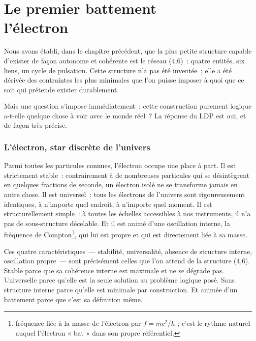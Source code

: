 \documentclass[12pt, a4paper, openright]{book}
\begin{document}
\chapter[Le premier battement --- l'électron]{Le premier battement \\ l'électron}

Nous avons établi, dans le chapitre précédent, que la plus petite structure capable d'exister de façon autonome et cohérente est le réseau (4,6)~: quatre entités, six liens, un cycle de pulsation. Cette structure n'a pas été inventée~; elle a été dérivée des contraintes les plus minimales que l'on puisse imposer à quoi que ce soit qui prétende exister durablement.

\medskip

Mais une question s'impose immédiatement~: cette construction purement logique a-t-elle quelque chose à voir avec le monde réel~? La réponse du LDP est oui, et de façon très précise.

\subsection*{L'électron, star discrète de l'univers}

Parmi toutes les particules connues, l'électron occupe une place à part. Il est strictement stable~: contrairement à de nombreuses particules qui se désintègrent en quelques fractions de seconde, un électron isolé ne se transforme jamais en autre chose. Il est universel~: tous les électrons de l'univers sont rigoureusement identiques, à n'importe quel endroit, à n'importe quel moment. Il est structurellement simple~: à toutes les échelles accessibles à nos instruments, il n'a pas de sous-structure décelable. Et il est animé d'une oscillation interne, la fréquence de Compton\footnote{fréquence liée à la masse de l'électron par $f = mc^2/h$ ; c'est le rythme naturel auquel l'électron « bat » dans son propre référentiel.}, qui lui est propre et qui est directement liée à sa masse.

\medskip

Ces quatre caractéristiques~--- stabilité, universalité, absence de structure interne, oscillation propre~--- sont précisément celles que l'on attend de la structure (4,6). Stable parce que sa cohérence interne est maximale et ne se dégrade pas. Universelle parce qu'elle est la seule solution au problème logique posé. Sans structure interne parce qu'elle est minimale par construction. Et animée d'un battement parce que c'est sa définition même.
\end{document}
